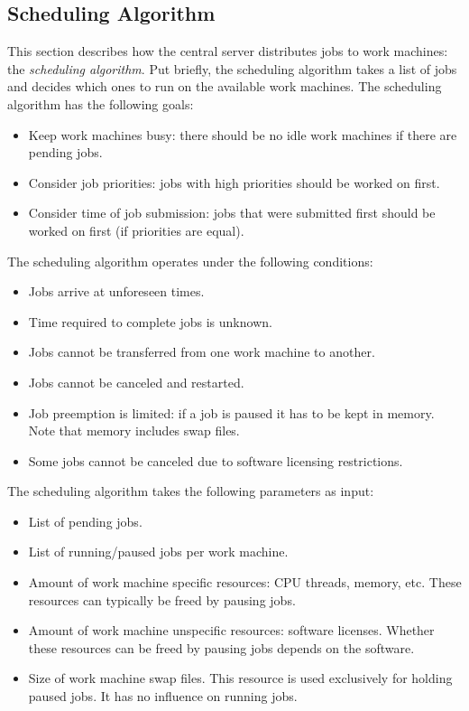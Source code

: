 \subsection{Scheduling Algorithm}
This section describes how the central server distributes jobs to work machines: the \textit{scheduling algorithm}.
Put briefly, the scheduling algorithm takes a list of jobs and decides which ones to run on the available work machines.
The scheduling algorithm has the following goals:
\begin{itemize}
\item Keep work machines busy: there should be no idle work machines if there are pending jobs.
\item Consider job priorities: jobs with high priorities should be worked on first.
\item Consider time of job submission: jobs that were submitted first should be worked on first (if priorities are equal).
\end{itemize}
The scheduling algorithm operates under the following conditions:
\begin{itemize}
\item Jobs arrive at unforeseen times.
\item Time required to complete jobs is unknown.
\item Jobs cannot be transferred from one work machine to another.
\item Jobs cannot be canceled and restarted.
\item Job preemption is limited: if a job is paused it has to be kept in memory.
Note that memory includes swap files.
\item Some jobs cannot be canceled due to software licensing restrictions.
\end{itemize}
The scheduling algorithm takes the following parameters as input:
\begin{itemize}
\item List of pending jobs.
\item List of running/paused jobs per work machine.
\item Amount of work machine specific resources: CPU threads, memory, etc.
These resources can typically be freed by pausing jobs.
\item Amount of work machine unspecific resources: software licenses.
Whether these resources can be freed by pausing jobs depends on the software.
\item Size of work machine swap files.
This resource is used exclusively for holding paused jobs.
It has no influence on running jobs.
\end{itemize}
